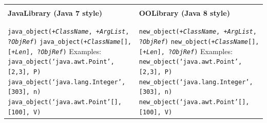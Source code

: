 \begin{table}
    \begin{center}{\scriptsize
    \begin{tabular}{p{6.5cm}p{7cm}}\hline\hline
    \\
    {\small \textbf{JavaLibrary (Java 7 style)}} &
    {\small \textbf{OOLibrary (Java 8 style)}}
     \\\\\hline\\
    \texttt{java\_object(+\textit{ClassName}, +\textit{ArgList}, ?\textit{ObjRef})}\newline
    \texttt{java\_object(+\textit{ClassName}[], [+\textit{Len}], ?\textit{ObjRef})}
    \newline
    \newline
    Examples:\newline
    \texttt{java\_object(`java.awt.Point', [2,3], P)}\newline
    \texttt{java\_object(`java.lang.Integer', [303], n)}\newline
    \texttt{java\_object(`java.awt.Point'[], [100], V)}
    &
    \texttt{new\_object(+\textit{ClassName}, +\textit{ArgList}, ?\textit{ObjRef})}\newline
    \texttt{new\_object(+\textit{ClassName}[], [+\textit{Len}], ?\textit{ObjRef})}
    \newline
    \newline
    Examples:\newline
    \texttt{new\_object(`java.awt.Point', [2,3], P)}\newline
    \texttt{new\_object(`java.lang.Integer', [303], n)}\newline
    \texttt{new\_object(`java.awt.Point'[], [100], V)}


\end{tabular}}
\end{center}
\end{table}
